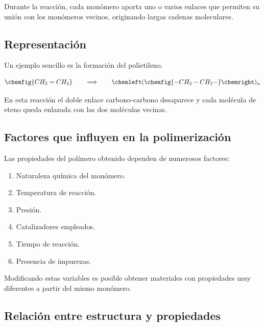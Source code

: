 Durante la reacción, cada monómero aporta uno o varios enlaces que permiten su unión
con los monómeros vecinos, originando largas cadenas moleculares.


\subsection{Representación}

Un ejemplo sencillo es la formación del polietileno.

\[
\chemfig{CH_2=CH_2}
\qquad
\Longrightarrow
\qquad
\chemleft(
\chemfig{-CH_2-CH_2-}
\chemright)_n
\]

En esta reacción el doble enlace carbono-carbono desaparece y cada molécula de
eteno queda enlazada con las dos moléculas vecinas.


\subsection{Factores que influyen en la polimerización}

Las propiedades del polímero obtenido dependen de numerosos factores:

\begin{enumerate}[label=\alph*)]

\item Naturaleza química del monómero.

\item Temperatura de reacción.

\item Presión.

\item Catalizadores empleados.

\item Tiempo de reacción.

\item Presencia de impurezas.

\end{enumerate}

Modificando estas variables es posible obtener materiales con propiedades muy
diferentes a partir del mismo monómero.


\subsection{Relación entre estructura y propiedades}

